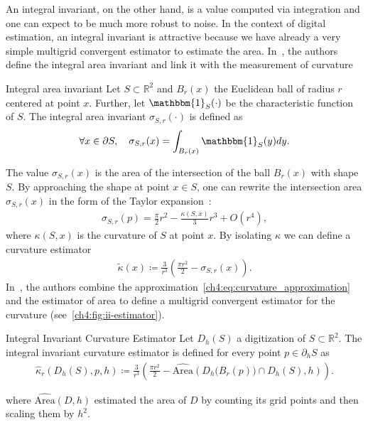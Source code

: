 An integral invariant, on the other hand, is a value computed via integration and one can expect to be much more robust to noise. In the context of digital estimation, an integral invariant is attractive because we have already a very simple multigrid convergent estimator to estimate the area. In~\cite{manay04intinvariant}, the authors define the integral area invariant and link it with the measurement of curvature

\begin{definition}{Integral area invariant}
  Let $S \subset \mathbb{R}^2$ and $B_r(x)$ the Euclidean ball of radius $r$ centered at point $x$. Further, let  $\mathbbm{1}_S(\cdot)$ be the characteristic function of $S$. The integral area invariant $\sigma_{S,r}(\cdot)$ is
  defined as
  \begin{align*}
    \forall x \in \partial S, \quad \sigma_{S,r}(x) = \int_{B_r(x)}{ \mathbbm{1}_S(y) dy}.
  \end{align*}
\end{definition}
%
%
The value $\sigma_{S,r}(x)$ is the area of the intersection of the ball $B_r(x)$ with shape $S$. By approaching the shape at point $x \in S$, one can rewrite the intersection area $\sigma_{S,r}(x)$ in the form of the Taylor expansion~\cite{pottman09intinvariant}:
\begin{align*}
  \sigma_{S,r}(p) = \frac{\pi}{2}r^2 - \frac{\kappa(S,x)}{3}r^3 + O(r^4),
\end{align*}
%
where $\kappa(S,x)$ is the curvature of $S$ at point $x$. By isolating $\kappa$ we can define a curvature estimator
%	
\begin{align}
  \tilde{\kappa}(x) \coloneqq \frac{3}{r^3}\left( \frac{\pi r^2}{2} - \sigma_{S,r}(x) \right).
  \label{ch4:eq:curvature_approximation}
\end{align}
%
In~\cite{coeurjolly13integral}, the authors combine the approximation~\cref{ch4:eq:curvature_approximation} and the estimator of area to define a multigrid convergent estimator for the curvature (see~\cref{ch4:fig:ii-estimator}).

\begin{definition}{Integral Invariant Curvature Estimator}
  Let $D_h(S)$ a digitization of $S \subset \mathbb{R}^2$. The integral invariant curvature estimator is defined for every point $p \in \partial_h S$ as
  \begin{align*}
    \hat{\kappa}_{r}(D_h(S),p,h) \coloneqq \frac{3}{r^3} \left( \frac{\pi r^2}{2} - \widehat{\text{Area}} \left( D_h\big( B_{r} ( p ) \big) \cap D_h(S), h \right) \right).
  \end{align*}
\end{definition}
%
where $\widehat{\text{Area}}( D,h )$ estimated the area of $D$ by counting its grid points and then scaling them by $h^2$. 

